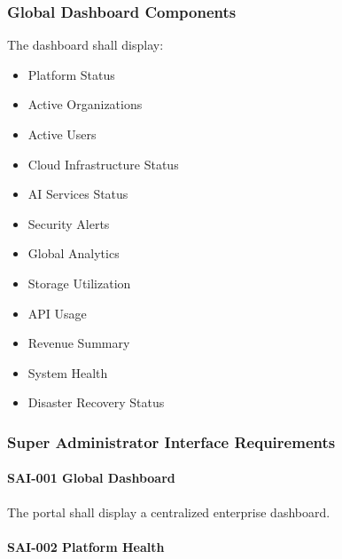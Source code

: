 
\subsubsection*{Global Dashboard Components}

The dashboard shall display:

\begin{itemize}

\item Platform Status

\item Active Organizations

\item Active Users

\item Cloud Infrastructure Status

\item AI Services Status

\item Security Alerts

\item Global Analytics

\item Storage Utilization

\item API Usage

\item Revenue Summary

\item System Health

\item Disaster Recovery Status

\end{itemize}


\subsubsection*{Super Administrator Interface Requirements}

\paragraph{SAI-001 Global Dashboard}

The portal shall display a centralized enterprise dashboard.

\paragraph{SAI-002 Platform Health}

